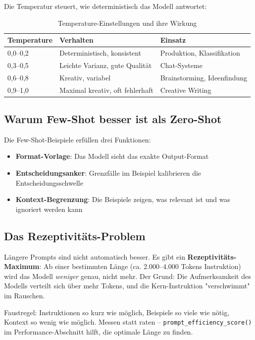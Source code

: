 Die Temperatur steuert, wie deterministisch das Modell antwortet:

\begin{table}[H]
\centering
\begin{tabularx}{\linewidth}{lXX}
\toprule
\textbf{Temperature} & \textbf{Verhalten} & \textbf{Einsatz} \\
\midrule
0,0--0,2 & Deterministisch, konsistent & Produktion, Klassifikation \\
0,3--0,5 & Leichte Varianz, gute Qualität & Chat-Systeme \\
0,6--0,8 & Kreativ, variabel & Brainstorming, Ideenfindung \\
0,9--1,0 & Maximal kreativ, oft fehlerhaft & Creative Writing \\
\midrule
\end{tabularx}
\caption{Temperature-Einstellungen und ihre Wirkung}
\label{tab:temperature}
\end{table}

\subsection{Warum Few-Shot besser ist als Zero-Shot}

Die Few-Shot-Beispiele erfüllen drei Funktionen:
\begin{itemize}[leftmargin=*]
    \item \textbf{Format-Vorlage}: Das Modell sieht das exakte Output-Format
    \item \textbf{Entscheidungsanker}: Grenzfälle im Beispiel kalibrieren die Entscheidungsschwelle
    \item \textbf{Kontext-Begrenzung}: Die Beispiele zeigen, was relevant ist und was ignoriert werden kann
\end{itemize}

\subsection{Das Rezeptivitäts-Problem}

Längere Prompts sind nicht automatisch besser. Es gibt ein \textbf{Rezeptivitäts-Maximum}: Ab einer bestimmten Länge (ca. 2.000--4.000 Tokens Instruktion) wird das Modell \textit{weniger} genau, nicht mehr. Der Grund: Die Aufmerksamkeit des Modells verteilt sich über mehr Tokens, und die Kern-Instruktion "verschwimmt" im Rauschen.

\begin{praxishinweis}
Faustregel: Instruktionen so kurz wie möglich, Beispiele so viele wie nötig, Kontext so wenig wie möglich. Messen statt raten -- \texttt{prompt\_efficiency\_score()} im Performance-Abschnitt hilft, die optimale Länge zu finden.
\end{praxishinweis}

